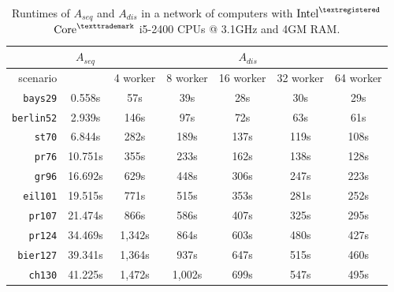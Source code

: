 \begin{table}[h!]
  \centering
  \begin{tabular}{r|c||c|c|c|c|c|}
    \cline{2-7}
    & \multicolumn{1}{c||}{$A_{seq}$} & \multicolumn{5}{c|}{$A_{dis}$} \\
    \hline
    \multicolumn{1}{|r||}{scenario} & & 4 worker & 8 worker & 16 worker & 32 worker & 64 worker \\
    \hline
    \hline
    \multicolumn{1}{|r||}{\texttt{bays29}} & 0.558s & 57s & 39s & 28s & 30s & 29s \\
    \hline
    \multicolumn{1}{|r||}{\texttt{berlin52}} & 2.939s & 146s & 97s & 72s & 63s & 61s \\
    \hline
    \multicolumn{1}{|r||}{\texttt{st70}} & 6.844s & 282s & 189s & 137s & 119s & 108s \\
    \hline
    \multicolumn{1}{|r||}{\texttt{pr76}} & 10.751s & 355s & 233s & 162s & 138s & 128s \\
    \hline
    \multicolumn{1}{|r||}{\texttt{gr96}} & 16.692s & 629s & 448s & 306s & 247s & 223s \\
    \hline
    \multicolumn{1}{|r||}{\texttt{eil101}} & 19.515s & 771s & 515s & 353s & 281s & 252s \\
    \hline
    \multicolumn{1}{|r||}{\texttt{pr107}} & 21.474s & 866s & 586s & 407s & 325s & 295s \\
    \hline
    \multicolumn{1}{|r||}{\texttt{pr124}} & 34.469s & 1,342s & 864s & 603s & 480s & 427s \\
    \hline
    \multicolumn{1}{|r||}{\texttt{bier127}} & 39.341s & 1,364s & 937s & 647s & 515s & 460s \\
    \hline
    \multicolumn{1}{|r||}{\texttt{ch130}} & 41.225s & 1,472s & 1,002s & 699s & 547s & 495s \\
    \hline
  \end{tabular}
  \caption{Runtimes of $A_{seq}$ and $A_{dis}$ in a network of computers with $\text{Intel}^{\textregistered}$ $\text{Core}^{\texttrademark}$ i5-2400 CPUs @ 3.1GHz and 4GM RAM.}
  \vspace*{-0.75em}
  \label{tbl:test2}
\end{table}


